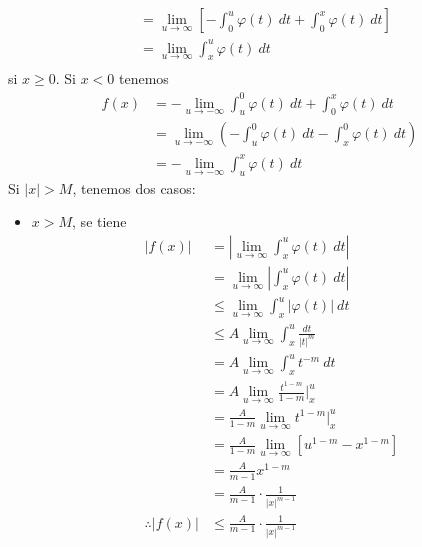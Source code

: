 \documentclass[12pt]{report}
\newcounter{it}
\theoremstyle{largebreak}
\renewcommand{\leq}{\ensuremath{\leqslant}}
\renewcommand{\geq}{\ensuremath{\geqslant}}
\newcommand\abs[1]{\ensuremath{\left|#1\right|}}
\begin{document}
\begin{sol}
\begin{equation*}
\begin{split}
                &=\lim_{u\rightarrow\infty}\left[-\int_0^u\varphi(t)\:dt+\int_0^x\varphi(t)\:dt\right]\\
                &=\lim_{u\rightarrow\infty}\int_x^u\varphi(t)\:dt\\
            \end{split}
        \end{equation*}
        si $x\geq0$. Si $x<0$ tenemos
        \begin{equation*}
            \begin{split}
                f(x)&=-\lim_{u\rightarrow-\infty}\int_u^0\varphi(t)\:dt+\int_0^x\varphi(t)\:dt\\
                &=\lim_{u\rightarrow-\infty}\left(-\int_u^0\varphi(t)\:dt-\int_x^0\varphi(t)\:dt\right)\\
                &=-\lim_{u\rightarrow-\infty}\int_u^x\varphi(t)\:dt
            \end{split}
        \end{equation*}
        Si $\abs{x}>M$, tenemos dos casos:
        \begin{itemize}
            \item $x>M$, se tiene
            \begin{equation*}
                \begin{split}
                    \abs{f(x)}&=\abs{\lim_{u\rightarrow\infty}\int_x^u\varphi(t)\:dt}\\
                    &=\lim_{u\rightarrow\infty}\abs{\int_x^u\varphi(t)\:dt}\\
                    &\leq\lim_{u\rightarrow\infty}\int_x^u\abs{\varphi(t)}\:dt\\
                    &\leq A\lim_{u\rightarrow\infty}\int_x^u\frac{dt}{\abs{t}^m}\\
                    &=A\lim_{u\rightarrow\infty}\int_x^u t^{-m}\:dt \\
                    &=A\lim_{u\rightarrow\infty}\frac{t^{ 1-m}}{1-m}\Big|_x^u\\
                    &=\frac{A}{1-m}\lim_{u\rightarrow\infty}t^{ 1-m}\Big|_x^u\\
                    &=\frac{A}{1-m}\lim_{u\rightarrow\infty}\left[u^{ 1-m}-x^{ 1-m}\right] \\
                    &=\frac{A}{m-1}x^{1-m}\\
                    &=\frac{A}{m-1}\cdot\frac{1}{\abs{x}^{m-1}}\\
                    \therefore \abs{f(x)}&\leq\frac{A}{m-1}\cdot\frac{1}{\abs{x}^{m-1}}\\

\end{split}
\end{equation*}
\end{itemize}
\end{sol}
\end{document}
